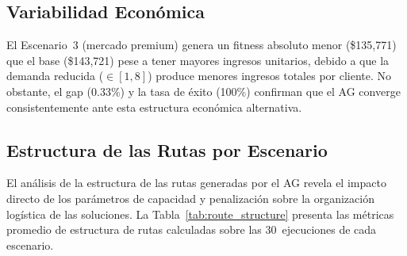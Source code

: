 \documentclass[12pt,letterpaper]{article}
\begin{document}
\subsection{Variabilidad Económica}

El Escenario~3 (mercado premium) genera un fitness absoluto menor (\$135{,}771) que el base (\$143{,}721) pese a tener mayores ingresos unitarios, debido a que la demanda reducida ($\in[1,8]$) produce menores ingresos totales por cliente. No obstante, el gap (0.33\%) y la tasa de éxito (100\%) confirman que el AG converge consistentemente ante esta estructura económica alternativa.

\subsection{Estructura de las Rutas por Escenario}

El análisis de la estructura de las rutas generadas por el AG revela el impacto directo de los parámetros de capacidad y penalización sobre la organización logística de las soluciones. La Tabla~\ref{tab:route_structure} presenta las métricas promedio de estructura de rutas calculadas sobre las 30~ejecuciones de cada escenario.

\begin{table}[H]
\centering
\caption{Estructura promedio de rutas por escenario (mejor solución de cada ejecución, 30~ejecuciones).}
\label{tab:route_structure}
\renewcommand{\arraystretch}{1.3}
\end{table}
\end{document}
